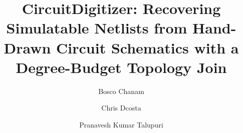 \begin{frontmatter}

\title{CircuitDigitizer: Recovering Simulatable Netlists from Hand-Drawn Circuit Schematics with a Degree-Budget Topology Join}

\author[scaai]{Bosco Chanam}

\author[scaai]{Chris Dcosta}

\author[usc]{Pranavesh Kumar Talupuri}


\address[scaai]{Symbiosis Centre for Applied Artificial Intelligence, Department of Computer Science and Engineering, Symbiosis Institute of Technology, Pune, India}
\address[usc]{Thomas Lord Department of Computer Science, University of Southern California, Los Angeles, California, United States}


\end{frontmatter}

